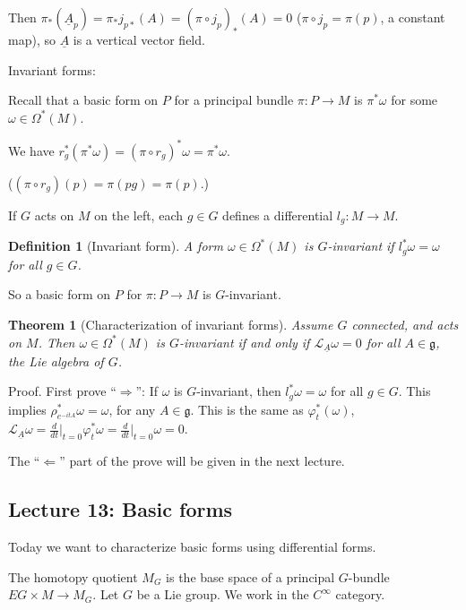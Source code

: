 \documentclass{article}
\theoremstyle{mystyle}
\newtheorem*{definition}{Definition}%
\newtheorem*{theorem*}{Theorem}
\theoremstyle{remark}
\numberwithin{equation}{section}
\begin{document}
Then $\pi_*(\underline{A}_p) = \pi_*j_{p*}(A) = (\pi\circ j_p)_*(A) = 0$ ($\pi\circ j_p = \pi(p)$, a constant map), so $\underline{A}$ is a vertical vector field.

Invariant forms:

Recall that a basic form on $P$ for a principal bundle $\pi\colon P\rightarrow M$ is $\pi^*\omega$ for some $\omega \in \Omega^*(M)$. 

We have $r_g^*(\pi^*\omega) = (\pi\circ r_g)^*\omega = \pi^*\omega$. 

($(\pi\circ r_g)(p) = \pi(pg) = \pi(p)$.)



If $G$ acts on $M$ on the left, each $g\in G$ defines a differential $l_g\colon M\rightarrow M$.

\begin{definition}[Invariant form]
A form $\omega \in \Omega^*(M)$ is \emph{$G$-invariant} if $l^*_g\omega = \omega$ for all $g \in G$. 
\end{definition}

So a basic form on $P$ for $\pi\colon P\rightarrow M$ is $G$-invariant.

\begin{theorem*}[Characterization of invariant forms] Assume $G$ connected, and acts on $M$. Then $\omega \in \Omega^*(M)$ is $G$-invariant if and only if $\mathcal{L}_{\underline{A}}\omega = 0 $ for all $A\in \mathfrak{g}$, the Lie algebra of $G$.
\end{theorem*}

Proof. First prove ``$\Rightarrow$'': If $\omega$ is $G$-invariant, then $l_g^*\omega = \omega$ for all $g \in G$. This implies $\rho^*_{e^{-itA}} \omega = \omega$, for any $A \in \mathfrak{g}$.  This is the same as $\varphi_t^*(\omega)$, $\mathcal{L}_{\underline{A}}\omega = \frac{d}{dt}\Big|_{t=0} \varphi^*_t\omega
 = \frac{d}{dt}\Big|_{t=0}\omega = 0$. 

The ``$\Leftarrow$'' part of the prove will be given in the next lecture.


\subsection{Lecture 13: Basic forms}

Today we want to characterize basic forms using differential forms.


The homotopy quotient $M_G$ is the base space of a principal $G$-bundle $EG\times M\rightarrow M_G$. Let $G$ be a Lie group. We work in the $C^\infty$ category.
\end{document}
